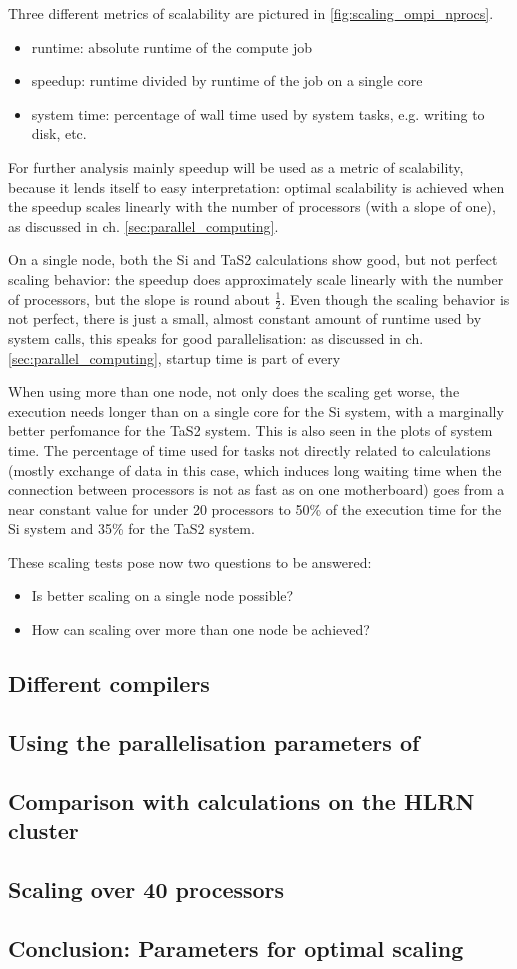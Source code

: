 \documentclass[main.tex]{subfiles}
\begin{document}

Three different metrics of scalability are pictured in \ref{fig:scaling_ompi_nprocs}.
\begin{itemize}
    \item runtime: absolute runtime of the compute job
    \item speedup: runtime divided by runtime of the job on a single core
    \item system time: percentage of wall time used by system tasks, e.g. writing to disk, etc.
\end{itemize}
For further analysis mainly speedup will be used as a metric of scalability, because it lends itself to easy interpretation: optimal scalability is achieved when the speedup scales linearly with the number of processors (with a slope of one), as discussed in ch. \ref{sec:parallel_computing}.

On a single node, both the Si and TaS2 calculations show good, but not perfect scaling behavior: the speedup does approximately scale linearly with the number of processors, but the slope is round about \(\frac{1}{2}\).
Even though the scaling behavior is not perfect, there is just a small, almost constant amount of runtime used by system calls, this speaks for good parallelisation: as discussed in ch. \ref{sec:parallel_computing}, startup time is part of every 

When using more than one node, not only does the scaling get worse, the execution needs longer than on a single core for the Si system, with a marginally better perfomance for the TaS2 system.
This is also seen in the plots of system time. The percentage of time used for tasks not directly related to calculations (mostly exchange of data in this case, which induces long waiting time when the connection between processors is not as fast as on one motherboard) goes from a near constant value for under 20 processors to 50\% of the execution time for the Si system and 35\% for the TaS2 system.

These scaling tests pose now two questions to be answered:
\begin{itemize}
    \item Is better scaling on a single node possible?
    \item How can scaling over more than one node be achieved?
\end{itemize}

\subsection{Different compilers}

\subsection{Using the parallelisation parameters of \QE}

\subsection{Comparison with calculations on the HLRN cluster}

\subsection{Scaling over 40 processors}

\subsection{Conclusion: Parameters for optimal scaling}
\end{document}
